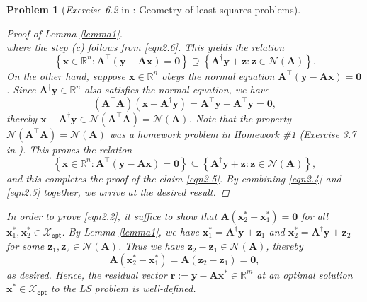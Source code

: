 \documentclass[11pt]{article}
\newtheorem{problem}{Problem}
\numberwithin{equation}{problem}
\begin{document}
\begin{problem} [\emph{Exercise 6.2} in \cite{calafiore2014optimization}: Geometry of least-squares problems]
{\begin{proof} [Proof of Lemma \ref{lemma1}]
\begin{equation*}
\end{equation*}
where the step (c) follows from \eqref{eqn2.6}. This yields the relation
\begin{equation*}
    \left\{ \mathbf{x} \in \mathbb{R}^n : \mathbf{A}^{\top} \left( \mathbf{y} - \mathbf{A} \mathbf{x} \right) = \mathbf{0} \right\} 
    \supseteq \left\{ \mathbf{A}^{\dagger} \mathbf{y} + \mathbf{z} : \mathbf{z} \in \mathcal{N} (\mathbf{A}) \right\}.
\end{equation*}
On the other hand, suppose $\mathbf{x} \in \mathbb{R}^n$ obeys the normal equation $\mathbf{A}^{\top} \left( \mathbf{y} - \mathbf{A} \mathbf{x} \right) = \mathbf{0}$. Since $\mathbf{A}^{\dagger} \mathbf{y} \in \mathbb{R}^n$ also satisfies the normal equation, we have
\begin{equation}
    \label{eqn2.7}
    \left( \mathbf{A}^{\top} \mathbf{A} \right) \left( \mathbf{x} - \mathbf{A}^{\dagger} \mathbf{y} \right)
    = \mathbf{A}^{\top} \mathbf{y} - \mathbf{A}^{\top} \mathbf{y} = \mathbf{0},
\end{equation}
thereby $\mathbf{x} - \mathbf{A}^{\dagger} \mathbf{y} \in \mathcal{N} \left( \mathbf{A}^{\top} \mathbf{A} \right) = \mathcal{N} (\mathbf{A})$. Note that the property $\mathcal{N} \left( \mathbf{A}^{\top} \mathbf{A} \right) = \mathcal{N} (\mathbf{A})$ was a homework problem in Homework \#1 (\emph{Exercise 3.7} in \cite{calafiore2014optimization}). This proves the relation 
\begin{equation*}
    \left\{ \mathbf{x} \in \mathbb{R}^n : \mathbf{A}^{\top} \left( \mathbf{y} - \mathbf{A} \mathbf{x} \right) = \mathbf{0} \right\} 
    \subseteq \left\{ \mathbf{A}^{\dagger} \mathbf{y} + \mathbf{z} : \mathbf{z} \in \mathcal{N} (\mathbf{A}) \right\},
\end{equation*}
and this completes the proof of the claim \eqref{eqn2.5}. By combining \eqref{eqn2.4} and \eqref{eqn2.5} together, we arrive at the desired result.

\end{proof}

\indent In order to prove \eqref{eqn2.2}, it suffice to show that $\mathbf{A} \left( \mathbf{x}_{2}^* - \mathbf{x}_{1}^* \right) = \mathbf{0}$ for all $\mathbf{x}_{1}^*, \mathbf{x}_{2}^* \in \mathcal{X}_{\textsf{opt}}$. By Lemma \ref{lemma1}, we have $\mathbf{x}_{1}^* = \mathbf{A}^{\dagger} \mathbf{y} + \mathbf{z}_1$ and $\mathbf{x}_{2}^* = \mathbf{A}^{\dagger} \mathbf{y} + \mathbf{z}_2$ for some $\mathbf{z}_1, \mathbf{z}_2 \in \mathcal{N}(\mathbf{A})$. Thus we have $\mathbf{z}_2 - \mathbf{z}_1 \in \mathcal{N} (\mathbf{A})$, thereby
\begin{equation*}
    \mathbf{A} \left( \mathbf{x}_{2}^* - \mathbf{x}_{1}^* \right) = \mathbf{A} \left( \mathbf{z}_{2} - \mathbf{z}_{1} \right) = \mathbf{0},
\end{equation*}
as desired. Hence, the residual vector $\mathbf{r} := \mathbf{y} - \mathbf{A} \mathbf{x}^* \in \mathbb{R}^m$ at an optimal solution $\mathbf{x}^* \in \mathcal{X}_{\textsf{opt}}$ to the \textsf{LS} problem is well-defined. 
\medskip

}
\end{problem}
\end{document}

